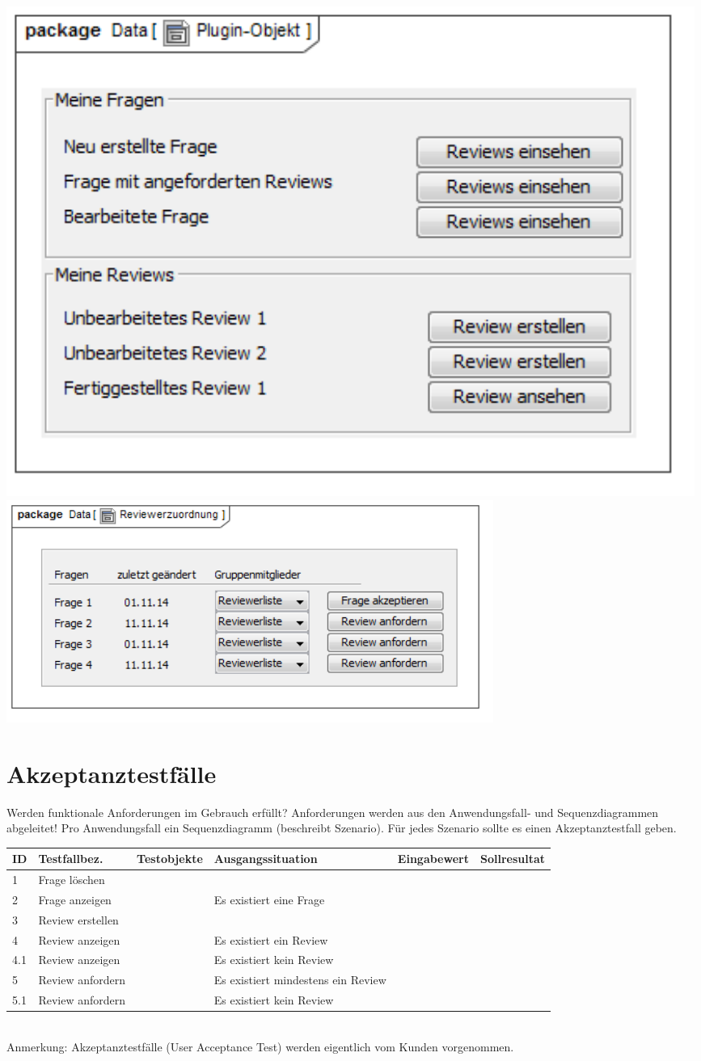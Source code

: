\documentclass[a4paper]{scrreprt}
\begin{document}
\includegraphics[width=0.99\textwidth]{User_Interface_Modeling_Diagram__Plugin-Objekt.png}
\label{Grafische Benutzeroberfläche Autor}
\\
\includegraphics[width=0.7\textwidth]{User_Interface_Modeling_Diagram__Reviewerzuordnung.png}
\label{Grafische Benutzeroberfläche Autor}


\chapter{Akzeptanztestfälle}
Werden funktionale Anforderungen im Gebrauch erfüllt?
Anforderungen werden aus den Anwendungsfall- und Sequenzdiagrammen abgeleitet!
Pro Anwendungsfall ein Sequenzdiagramm (beschreibt Szenario).
Für jedes Szenario sollte es einen Akzeptanztestfall geben.\\

\begin{tabular}{|p{0.5cm}|p{2cm}|p{2.5cm}|p{3cm}|p{2cm}|p{2cm}|}\hline
ID & Testfallbez.&Testobjekte&Ausgangssituation&Eingabewert&Sollresultat \\\hline
1 & Frage löschen &&&&\\\hline
2 & Frage anzeigen &&Es existiert eine Frage&&\\\hline
3 & Review erstellen &&&&\\\hline
4 & Review anzeigen &&Es existiert ein Review&&\\\hline
4.1 & Review anzeigen &&Es existiert kein Review	&&\\\hline
5 & Review anfordern &&Es existiert mindestens ein Review&&\\\hline
5.1 & Review anfordern &&Es existiert kein Review&&\\\hline
\end{tabular}\\
Anmerkung: Akzeptanztestfälle (User Acceptance Test) werden eigentlich vom Kunden vorgenommen.
 
 
\end{document}
